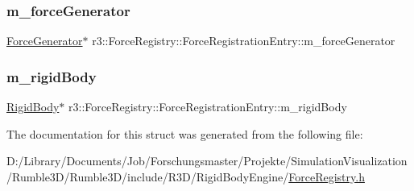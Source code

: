 \subsubsection{\texorpdfstring{m\+\_\+force\+Generator}{m\_forceGenerator}}
{\footnotesize\ttfamily \mbox{\hyperlink{classr3_1_1_force_generator}{Force\+Generator}}$\ast$ r3\+::\+Force\+Registry\+::\+Force\+Registration\+Entry\+::m\+\_\+force\+Generator}

\mbox{\label{structr3_1_1_force_registry_1_1_force_registration_entry_a103ff58c0c8f46f2ed1927976bc5dc87}} 
\subsubsection{\texorpdfstring{m\+\_\+rigid\+Body}{m\_rigidBody}}
{\footnotesize\ttfamily \mbox{\hyperlink{classr3_1_1_rigid_body}{Rigid\+Body}}$\ast$ r3\+::\+Force\+Registry\+::\+Force\+Registration\+Entry\+::m\+\_\+rigid\+Body}



The documentation for this struct was generated from the following file\+:\begin{DoxyCompactItemize}
\item 
D\+:/\+Library/\+Documents/\+Job/\+Forschungsmaster/\+Projekte/\+Simulation\+Visualization/\+Rumble3\+D/\+Rumble3\+D/include/\+R3\+D/\+Rigid\+Body\+Engine/\mbox{\hyperlink{_force_registry_8h}{Force\+Registry.\+h}}\end{DoxyCompactItemize}

